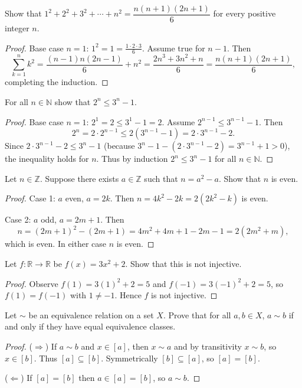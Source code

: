 \documentclass[12pt]{article}
\begin{document}
\begin{problem}
Show that $1^2+2^2+3^2+\cdots+n^2 = \dfrac{n(n+1)(2n+1)}{6}$ for every positive integer $n$.

\begin{proof}
Base case $n=1$: $1^2 = 1 = \frac{1\cdot2\cdot3}{6}$. Assume true for $n-1$. Then
\[
    \sum_{k=1}^n k^2 = \frac{(n-1)n(2n-1)}{6} + n^2
    = \frac{2n^3+3n^2+n}{6} = \frac{n(n+1)(2n+1)}{6},
\]
completing the induction.
\end{proof}
\end{problem}

\begin{problem}
For all $n\in\mathbb{N}$ show that $2^n \le 3^n-1$.

\begin{proof}
Base case $n=1$: $2^1=2\le 3^1-1=2$. Assume $2^{n-1}\le 3^{n-1}-1$. Then
\[
    2^n = 2\cdot 2^{n-1} \le 2(3^{n-1}-1) = 2\cdot 3^{n-1}-2.
\]
Since $2\cdot 3^{n-1}-2 \le 3^n-1$ (because $3^n-1 - (2\cdot 3^{n-1}-2) = 3^{n-1}+1>0$), the inequality holds for $n$.
Thus by induction $2^n\le 3^n-1$ for all $n\in\mathbb{N}$.
\end{proof}
\end{problem}

\begin{problem}
Let $n\in\mathbb{Z}$. Suppose there exists $a\in\mathbb{Z}$ such that $n=a^2-a$. Show that $n$ is even.

\begin{proof}
Case 1: $a$ even, $a=2k$. Then $n=4k^2-2k=2(2k^2-k)$ is even.

Case 2: $a$ odd, $a=2m+1$. Then
\[
    n=(2m+1)^2-(2m+1)=4m^2+4m+1-2m-1=2(2m^2+m),
\]
which is even. In either case $n$ is even.
\end{proof}
\end{problem}

\begin{problem}
Let $f:\mathbb{R}\to\mathbb{R}$ be $f(x)=3x^2+2$. Show that this is not injective.

\begin{proof}
Observe $f(1)=3(1)^2+2=5$ and $f(-1)=3(-1)^2+2=5$, so $f(1)=f(-1)$ with $1\neq -1$. Hence $f$ is not injective.
\end{proof}
\end{problem}

\begin{problem}
Let $\sim$ be an equivalence relation on a set $X$. Prove that for all $a,b\in X$, $a\sim b$ if and only if they have equal equivalence classes.

\begin{proof}
($\Rightarrow$) If $a\sim b$ and $x\in[a]$, then $x\sim a$ and by transitivity $x\sim b$, so $x\in[b]$. Thus $[a]\subseteq[b]$. Symmetrically $[b]\subseteq[a]$, so $[a]=[b]$.

($\Leftarrow$) If $[a]=[b]$ then $a\in[a]=[b]$, so $a\sim b$.
\end{proof}
\end{problem}
\end{document}
